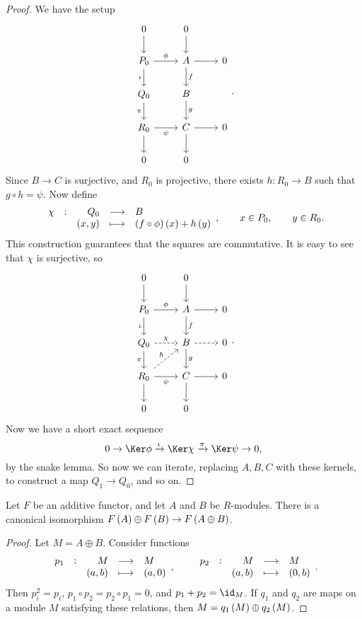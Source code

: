 \begin{proof}
We have the setup
$$
\begin{tikzcd}
0 \arrow{d} & 0 \arrow{d} & \\
P_0 \arrow{r}{\phi} \arrow[swap]{d}{\iota} & A \arrow{r} \arrow{d}{f} & 0 \\
Q_0 \arrow[swap]{d}{\pi} & B \arrow{d}{g} & \\
R_0 \arrow[swap]{r}{\psi} \arrow{d} & C \arrow{r} \arrow{d} & 0 \\
0 & 0 &
\end{tikzcd}.
$$
Since $ B \to C $ is surjective, and $ R_0 $ is projective, there exists $ h : R_0 \to B $ such that $ g \circ h = \psi $. Now define
$$ \function[\chi]{Q_0}{B}{\br{x, y}}{\br{f \circ \phi}\br{x} + h\br{y}}, \qquad x \in P_0, \qquad y \in R_0. $$
This construction guarantees that the squares are commutative. It is easy to see that $ \chi $ is surjective, so
$$
\begin{tikzcd}
0 \arrow{d} & 0 \arrow{d} & \\
P_0 \arrow{r}{\phi} \arrow[swap]{d}{\iota} & A \arrow{r} \arrow{d}{f} & 0 \\
Q_0 \arrow[dashed]{r}{\chi} \arrow[swap]{d}{\pi} & B \arrow[dashed]{r} \arrow{d}{g} & 0 \\
R_0 \arrow[dashed]{ur}{h} \arrow[swap]{r}{\psi} \arrow{d} & C \arrow{r} \arrow{d} & 0 \\
0 & 0 &
\end{tikzcd}.
$$
Now we have a short exact sequence
$$ 0 \to \Ker \phi \xrightarrow{\iota} \Ker \chi \xrightarrow{\pi} \Ker \psi \to 0, $$
by the snake lemma. So now we can iterate, replacing $ A, B, C $ with these kernels, to construct a map $ Q_1 \to Q_0 $, and so on.
\end{proof}

\begin{proposition}
Let $ F $ be an additive functor, and let $ A $ and $ B $ be $ R $-modules. There is a canonical isomorphism $ F\br{A} \oplus F\br{B} \to F\br{A \oplus B} $.
\end{proposition}

\begin{proof}
Let $ M = A \oplus B $. Consider functions
$$ \function[p_1]{M}{M}{\br{a, b}}{\br{a, 0}}, \qquad \function[p_2]{M}{M}{\br{a, b}}{\br{0, b}}. $$
Then $ p_i^2 = p_i $, $ p_1 \circ p_2 = p_2 \circ p_1 = 0 $, and $ p_1 + p_2 = \id_M $. If $ q_1 $ and $ q_2 $ are maps on a module $ M $ satisfying these relations, then $ M = q_1\br{M} \oplus q_2\br{M} $.
\end{proof}

